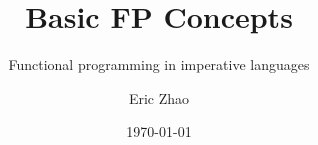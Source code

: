 \documentclass[xcolor={dvipsnames},xtable]{beamer}
\title{Basic FP Concepts}
\subtitle{Functional programming in imperative languages}
\date{\today}
\author{Eric Zhao}
\begin{document}

\newcommand{\sectiontitle}{}
\newcommand{\currenttitle}{}

\maketitle

\newcommand{\subdir}{sections}
\newcommand{\codedir}{listings}

\end{document}

